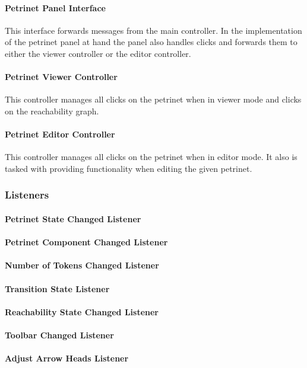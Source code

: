 \documentclass[10pt, a4paper]{article}
\begin{document}
\paragraph{Petrinet Panel Interface} This interface forwards messages from the main controller. In the implementation of the petrinet panel at hand the panel also handles clicks and forwards them to either the viewer controller or the editor controller. 
\paragraph{Petrinet Viewer Controller} This controller manages all clicks on the petrinet when in viewer mode and clicks on the reachability graph.  
\paragraph{Petrinet Editor Controller} This controller manages all clicks on the petrinet when in editor mode. It also is tasked with providing functionality when editing the given petrinet. 
\subsubsection{Listeners}

\paragraph{Petrinet State Changed Listener}
\paragraph{Petrinet Component Changed Listener}
\paragraph{Number of Tokens Changed Listener}
\paragraph{Transition State Listener}
\paragraph{Reachability State Changed Listener}
\paragraph{Toolbar Changed Listener}
\paragraph{Adjust Arrow Heads Listener}
\end{document}
